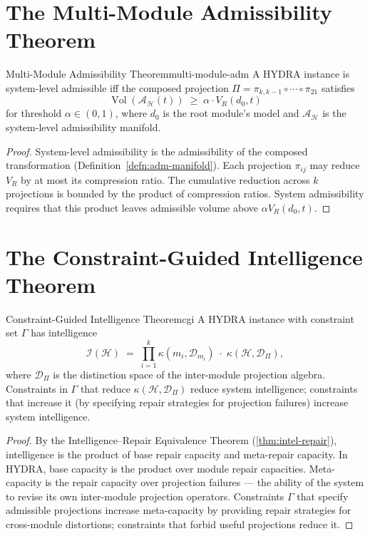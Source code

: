 \documentclass[12pt,twoside,openright]{book}
\newcommand{\adm}{\mathcal{A}}
\newcommand{\Vol}{\operatorname{Vol}}
\begin{document}
\section{The Multi-Module Admissibility Theorem}

\begin{theorem}{Multi-Module Admissibility Theorem}{multi-module-adm}
  A HYDRA instance is system-level admissible iff
  the composed projection
  $\Pi = \pi_{k,k-1} \circ \cdots \circ \pi_{21}$
  satisfies
  \[
    \Vol(\adm_\mathcal{H}(t)) \;\ge\; \alpha \cdot V_R(d_0, t)
  \]
  for threshold $\alpha \in (0,1)$, where $d_0$ is the
  root module's model and $\adm_\mathcal{H}$ is the
  system-level admissibility manifold.
\end{theorem}

\begin{proof}
  System-level admissibility is the admissibility of the
  composed transformation (Definition~\ref{defn:adm-manifold}).
  Each projection $\pi_{ij}$ may reduce $V_R$ by at most
  its compression ratio.
  The cumulative reduction across $k$ projections is
  bounded by the product of compression ratios.
  System admissibility requires that this product
  leaves admissible volume above $\alpha V_R(d_0, t)$.
\end{proof}

\section{The Constraint-Guided Intelligence Theorem}

\begin{theorem}{Constraint-Guided Intelligence Theorem}{cgi}
  A HYDRA instance with constraint set $\Gamma$ has
  intelligence
  \[
    \mathcal{I}(\mathcal{H})
    \;=\;
    \prod_{i=1}^k
    \kappa(m_i, \mathcal{D}_{m_i})
    \;\cdot\;
    \kappa(\mathcal{H}, \mathcal{D}_\Pi),
  \]
  where $\mathcal{D}_\Pi$ is the distinction space of
  the inter-module projection algebra.
  Constraints in $\Gamma$ that reduce
  $\kappa(\mathcal{H}, \mathcal{D}_\Pi)$ reduce
  system intelligence; constraints that increase it
  (by specifying repair strategies for projection failures)
  increase system intelligence.
\end{theorem}

\begin{proof}
  By the Intelligence--Repair Equivalence Theorem
  (\cref{thm:intel-repair}), intelligence is the product
  of base repair capacity and meta-repair capacity.
  In HYDRA, base capacity is the product over module
  repair capacities. Meta-capacity is the repair capacity
  over projection failures — the ability of the system
  to revise its own inter-module projection operators.
  Constraints $\Gamma$ that specify admissible projections
  increase meta-capacity by providing repair strategies
  for cross-module distortions; constraints that forbid
  useful projections reduce it.
\end{proof}
\end{document}

